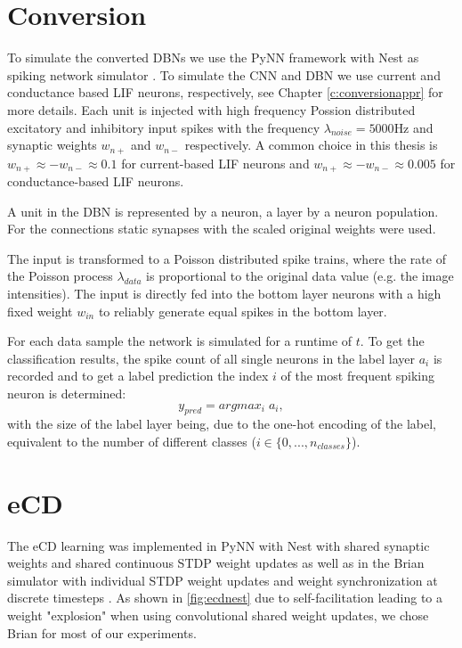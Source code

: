 \section{Conversion} \label{c:conversionimpl}

To simulate the converted DBNs we use the PyNN framework with Nest as spiking network simulator \cite{10.3389/neuro.11.011.2008}\cite{Gewaltig:NEST}.
To simulate the CNN and DBN we use current and conductance based LIF neurons, respectively, see Chapter \ref{c:conversionappr} for more details.
Each unit is injected with high frequency Possion distributed excitatory and inhibitory input spikes with the frequency $\lambda_{noise}= 5000 \text{Hz}$ and synaptic weights $w_{n+}$ and $w_{n-}$ respectively.
A common choice in this thesis is $w_{n+} \approx - w_{n-} \approx 0.1$ for current-based LIF neurons and  $w_{n+} \approx - w_{n-} \approx 0.005$ for conductance-based LIF neurons.

A unit in the DBN is represented by a neuron, a layer by a neuron population.
For the connections static synapses with the scaled original weights were used. 

The input is transformed to a Poisson distributed spike trains, where the rate of the Poisson process $\lambda_{data}$ is proportional to the original data value (e.g. the image intensities). 
The input is directly fed into the bottom layer neurons with a high fixed weight $w_{in}$ to reliably generate equal spikes in the bottom layer.    

For each data sample the network is simulated for a runtime of $t$. 
To get the classification results, the spike count of all single neurons in the label layer $a_i$ is recorded and to get a label prediction the index $i$ of the most frequent spiking neuron is determined:
\[
y_{pred} = argmax_i \; a_i,
\]
with the size of the label layer being, due to the one-hot encoding of the label, equivalent to the number of different classes ($i \in \{0,..., n_{classes}\}$). 

\section{eCD} \label{c:ecdimpl}

The eCD learning was implemented in PyNN with Nest with shared synaptic weights and shared continuous STDP weight updates as well as in the Brian simulator with individual STDP weight updates and weight synchronization at discrete timesteps \cite{10.3389/neuro.11.011.2008}\cite{Gewaltig:NEST}\cite{10.3389/neuro.11.005.2008}. 
As shown in \ref{fig:ecdnest} due to self-facilitation leading to a weight "explosion" when using convolutional shared weight updates, we chose Brian for most of our experiments.

